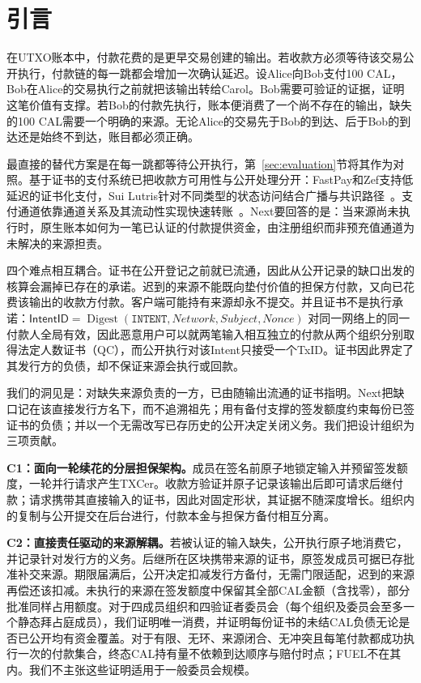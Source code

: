 \section{引言}
\label{sec:introduction}

在UTXO账本中，付款花费的是更早交易创建的输出。若收款方必须等待该交易公开执行，付款链的每一跳都会增加一次确认延迟。设Alice向Bob支付100 CAL，Bob在Alice的交易执行之前就把该输出转给Carol。Bob需要可验证的证据，证明这笔价值有支撑。若Bob的付款先执行，账本便消费了一个尚不存在的输出，缺失的100 CAL需要一个明确的来源。无论Alice的交易先于Bob的到达、后于Bob的到达还是始终不到达，账目都必须正确。

最直接的替代方案是在每一跳都等待公开执行，第~\ref{sec:evaluation}节将其作为对照。基于证书的支付系统已把收款方可用性与公开处理分开：FastPay和Zef支持低延迟的证书化支付，Sui Lutris针对不同类型的状态访问结合广播与共识路径~\cite{fastpay,zef,lutris}。支付通道依靠通道关系及其流动性实现快速转账~\cite{blitz,donner}。Next要回答的是：当来源尚未执行时，原生账本如何为一笔已认证的付款提供资金，由注册组织而非预充值通道为未解决的来源担责。

四个难点相互耦合。证书在公开登记之前就已流通，因此从公开记录的缺口出发的核算会漏掉已存在的承诺。迟到的来源不能既向垫付价值的担保方付款，又向已花费该输出的收款方付款。客户端可能持有来源却永不提交。并且证书不是执行承诺：$\mathsf{IntentID}=\operatorname{Digest}(\texttt{INTENT},\mathit{Network},\mathit{Subject},\mathit{Nonce})$ 对同一网络上的同一付款人全局有效，因此恶意用户可以就两笔输入相互独立的付款从两个组织分别取得法定人数证书（QC），而公开执行对该Intent只接受一个TxID。证书因此界定了其发行方的负债，却不保证来源会执行或回款。

我们的洞见是：对缺失来源负责的一方，已由随输出流通的证书指明。Next把缺口记在该直接发行方名下，而不追溯祖先；用有备付支撑的签发额度约束每份已签证书的负债；并以一个无需改写已存历史的公开决定关闭义务。我们把设计组织为三项贡献。

\noindent\textbf{C1：面向一轮续花的分层担保架构。}成员在签名前原子地锁定输入并预留签发额度，一轮并行请求产生TXCer。收款方验证并原子记录该输出后即可请求后继付款；请求携带其直接输入的证书，因此对固定形状，其证据不随深度增长。组织内的复制与公开提交在后台进行，付款本金与担保方备付相互分离。

\noindent\textbf{C2：直接责任驱动的来源解耦。}若被认证的输入缺失，公开执行原子地消费它，并记录针对发行方的义务。后继所在区块携带来源的证书，原签发成员可据已存批准补交来源。期限届满后，公开决定扣减发行方备付，无需门限适配，迟到的来源再偿还该扣减。未执行的来源在签发额度中保留其全部CAL金额（含找零），部分批准同样占用额度。对于四成员组织和四验证者委员会（每个组织及委员会至多一个静态拜占庭成员），我们证明唯一消费，并证明每份证书的未结CAL负债无论是否已公开均有资金覆盖。对于有限、无环、来源闭合、无冲突且每笔付款都成功执行一次的付款集合，终态CAL持有量不依赖到达顺序与赔付时点；FUEL不在其内。我们不主张这些证明适用于一般委员会规模。

